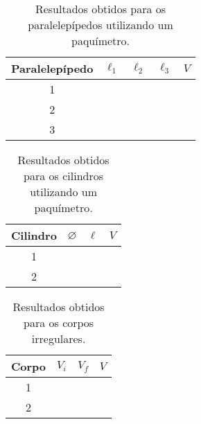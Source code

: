 \begin{table*}[!htpb]
    \begin{center}
	\label{TabelaDadosPaquimetro}
	\begin{tabular}{cp{25mm}p{25mm}p{25mm}p{25mm}}
		\toprule
		Paralelepípedo & $\ell_1$ & $\ell_2$ & $\ell_3$ & $V$  \\
		\midrule
		\cellcolor[gray]{0.89}1 & \cellcolor[gray]{0.92} & \cellcolor[gray]{0.89} & \cellcolor[gray]{0.92} & \cellcolor[gray]{0.89}\\
		\cellcolor[gray]{0.95}2 & \cellcolor[gray]{0.97} & \cellcolor[gray]{0.95} & \cellcolor[gray]{0.97} & \cellcolor[gray]{0.95}\\
		\cellcolor[gray]{0.89}3 & \cellcolor[gray]{0.92} & \cellcolor[gray]{0.89} & \cellcolor[gray]{0.92} & \cellcolor[gray]{0.89}\\
		\bottomrule
	\end{tabular}
	\end{center}
	\caption{Resultados obtidos para os paralelepípedos utilizando um paquímetro.}
\end{table*}

\begin{table*}[!htpb]
	\label{TabelaDadosPaquimetroCil}
	\begin{center}
	\begin{tabular}{cp{25mm}p{25mm}p{25mm}}
		\toprule
		Cilindro & $\diameter$ & $\ell$ & $V$  \\
		\midrule
		\cellcolor[gray]{0.89}1 & \cellcolor[gray]{0.92} & \cellcolor[gray]{0.89} & \cellcolor[gray]{0.92} \\
		\cellcolor[gray]{0.95}2 & \cellcolor[gray]{0.97} & \cellcolor[gray]{0.95} & \cellcolor[gray]{0.97} \\
		\bottomrule
	\end{tabular}
	\end{center}
	\caption{Resultados obtidos para os cilindros utilizando um paquímetro.}
\end{table*}

\begin{table*}[!htpb]
	\label{TabelaDadosProveta}
	\begin{center}
	\begin{tabular}{cp{25mm}p{25mm}p{25mm}}
		\toprule
		Corpo & $V_i$ & $V_f$ & $V$ \\
		\midrule
		\cellcolor[gray]{0.89}1 & \cellcolor[gray]{0.92} & \cellcolor[gray]{0.89} & \cellcolor[gray]{0.92} \\
		\cellcolor[gray]{0.95}2 & \cellcolor[gray]{0.97} & \cellcolor[gray]{0.95} & \cellcolor[gray]{0.97} \\
		\bottomrule
	\end{tabular}
	\end{center}
	\caption{Resultados obtidos para os corpos irregulares.}
\end{table*}

